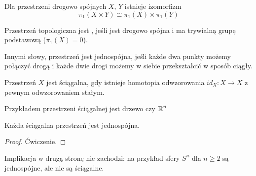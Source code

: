 \begin{conclusion}
  Dla przestrzeni drogowo spójnych $X$, $Y$ istnieje izomorfizm
  $$\pi_1(X\times Y)\cong \pi_1(X)\times\pi_1(Y)$$
\end{conclusion}

\begin{definition}
  Przestrzeń topologiczna jest , jeśli jest drogowo spójna i ma trywialną grupę podstawową ($\pi_1(X)=0$).
\end{definition}

Innymi słowy, przestrzeń jest jednospójna, jeśli każde dwa punkty możemy połączyć drogą i każde dwie drogi możemy w siebie przekształcić w sposób ciągły.

\begin{definition}
  Przestrzeń $X$ jest ściągalna, gdy istnieje homotopia odwzorowania $id_X:X\to X$ z pewnym odwzorowaniem stałym.
\end{definition}

Przykładem przestrzeni ściągalnej jest drzewo czy $\operatorname{\mathbb{R}}^n$

\begin{fact}
  Każda ściągalna przestrzeń jest jednospójna.
\end{fact}

\begin{proof}
  Ćwiczenie.
\end{proof}

Implikacja w drugą stronę nie zachodzi: na przykład sfery $S^n$ dla $n\geq 2$ są jednospójne, ale nie są ściągalne.


